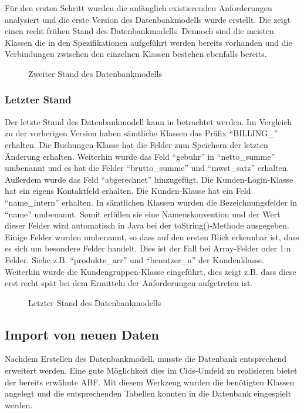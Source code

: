 Für den ersten Schritt wurden die anfänglich existierenden Anforderungen analysiert und die erste Version des Datenbankmodells wurde erstellt. 
Die  zeigt einen recht frühen Stand des Datenbankmodells.
Dennoch sind die meisten Klassen die in den Spezifikationen aufgeführt werden bereits vorhanden und die Verbindungen zwischen den einzelnen Klassen bestehen ebenfalls bereits. 

\begin{sidewaysfigure}
	\centering
	\caption{Zweiter Stand des Datenbankmodells}
	\label{fig:db-two}
\end{sidewaysfigure}

\subsubsection{Letzter Stand}
Der letzte Stand des Datenbankmodell kann in  betrachtet werden.
Im Vergleich zu der vorherigen Version haben sämtliche Klassen das Präfix "`BILLING\_"' erhalten.
Die Buchungen-Klasse hat die Felder zum Speichern der letzten Änderung erhalten. Weiterhin wurde das Feld "`gebuhr"' in "`netto\_summe"' umbenannt und es hat die Felder "`brutto\_summe"' und "`mwst\_satz"' erhalten. Außerdem wurde das Feld "`abgerechnet"' hinzugefügt.
Die Kunden-Login-Klasse hat ein eigens Kontaktfeld erhalten.
Die Kunden-Klasse hat ein Feld "`name\_intern"' erhalten.
In sämtlichen Klassen wurden die Bezeichnungsfelder in "`name"' umbenannt. Somit erfüllen sie eine Namenskonvention und der Wert dieser Felder wird automatisch in Java bei der toString()-Methode ausgegeben.
Einige Felder wurden umbenannt, so dass auf den ersten Blick erkennbar ist, dass es sich um besondere Felder handelt. Dies ist der Fall bei Array-Felder oder 1:n Felder. Siehe z.B. "`produkte\_arr"' und "`benutzer\_n"' der Kundenklasse.
Weiterhin wurde die Kundengruppen-Klasse eingeführt, dies zeigt z.B. dass diese erst recht spät bei dem Ermitteln der Anforderungen aufgetreten ist. 
\begin{sidewaysfigure}
	\centering
	\caption{Letzter Stand des Datenbankmodells}
	\label{fig:db-final}
\end{sidewaysfigure}

\subsection{Import von neuen Daten}
Nachdem Erstellen des Datenbankmodell, musste die Datenbank entsprechend erweitert werden.
Eine gute Möglichkeit dies im Cids-Umfeld zu realisieren bietet der bereits erwähnte \ac{ABF}. Mit diesem Werkzeug wurden die benötigten Klassen angelegt und die entsprechenden Tabellen konnten in die Datenbank eingespielt werden.

